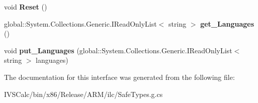 \begin{DoxyCompactItemize}
void {\bfseries Reset} ()
\item 
\mbox{\label{interface_windows_1_1_application_model_1_1_resources_1_1_core_1_1_i_resource_context_ad76a6478d3e3e15758a66c66adf8c42a}} 
global\+::\+System.\+Collections.\+Generic.\+I\+Read\+Only\+List$<$ string $>$ {\bfseries get\+\_\+\+Languages} ()
\item 
\mbox{\label{interface_windows_1_1_application_model_1_1_resources_1_1_core_1_1_i_resource_context_a6f1d9a3b30a2b326bcbad29ebaa379fb}} 
void {\bfseries put\+\_\+\+Languages} (global\+::\+System.\+Collections.\+Generic.\+I\+Read\+Only\+List$<$ string $>$ languages)
\end{DoxyCompactItemize}


The documentation for this interface was generated from the following file\+:\begin{DoxyCompactItemize}
\item 
I\+V\+S\+Calc/bin/x86/\+Release/\+A\+R\+M/ilc/Safe\+Types.\+g.\+cs\end{DoxyCompactItemize}
